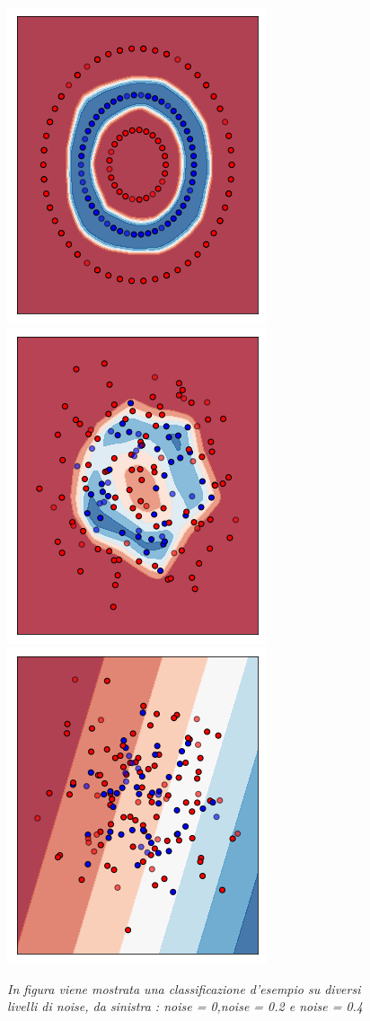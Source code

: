 \documentclass[12pt,a4paper]{report}
\begin{document}
\begin{figure}[H]
 \centering
 \includegraphics[scale = 0.35]{images/circles+-noise0.png}
 \includegraphics[scale = 0.35]{images/circles+-noise0,2.png}
 \includegraphics[scale = 0.35]{images/circles+-noise0,4.png}
 \caption{\textit{In figura viene mostrata una classificazione d'esempio su diversi livelli di noise, da sinistra : noise = 0,noise = 0.2 e noise = 0.4 }}
 \label{exnoisecircles+}
\end{figure}
\end{document}
